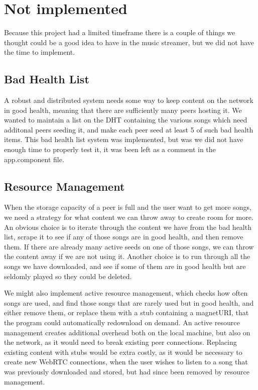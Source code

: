 

\section{Not implemented}
Because this project had a limited timeframe there is a couple of things
we thought could be a good idea to have in the
music streamer, but we did not have the time to implement.

\subsection{Bad Health List}
A robust and distributed system needs some way to keep content on the network in good health,
meaning that there are sufficiently many peers hosting it.
We wanted to maintain a list on the DHT containing the various songs which need additonal peers seeding it,
and make each peer seed at least 5 of such bad health items.
This bad health list system was implemented, but was we did not have enough time to properly test it,
it was been left as a comment in the app.component file.


\subsection{Resource Management}
When the storage capacity of a peer is full and the user want to get more songs,
we need a strategy for what content we can throw away to create room for more.
An obvious choice is to iterate through the content we have from the bad health list,
scrape it to see if any of those songs are in good health,
and then remove them.
If there are already many active seeds on one of those songs,
we can throw the content away if we are not using it.
Another choice is to run through all the songs we have downloaded,
and see if some of them are in good health but are seldomly played so they could be deleted.

We might also implement active resource management, which checks how often songs are used,
and find those songs that are rarely used but in good health, and either remove them,
or replace them with a stub containing a magnetURI, 
that the program could automatically redownload on demand.
An active resource management creates additional overhead both on the local machine,
but also on the network, as it would need to break existing peer connections.
Replacing existing content with stubs would be extra costly,
as it would be necessary to create new WebRTC connections,
when the user wishes to listen to a song that was previously downloaded and stored,
but had since been removed by resource management.

